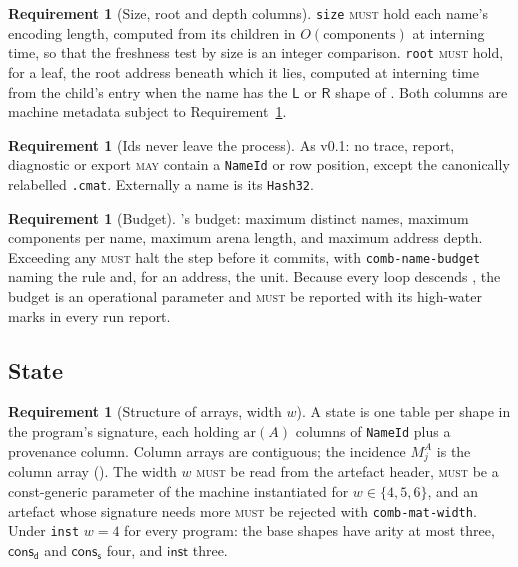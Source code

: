 \documentclass[11pt,a4paper]{article}
\newcommand{\code}[1]{\texttt{#1}}
\newcommand{\MUST}{\textsc{must}}
\newcommand{\MAY}{\textsc{may}}
\newcommand{\dd}{\mathsf{d}}
\newcommand{\sy}{\mathsf{s}}
\newcommand{\cons}{\mathsf{cons}}
\theoremstyle{definition}
\newtheorem{requirement}[definition]{Requirement}
\theoremstyle{plain}
\newcommand{\Lft}{\mathsf{L}}
\newcommand{\Rgt}{\mathsf{R}}
\newcommand{\inst}{\mathsf{inst}}
\begin{document}
\begin{requirement}[Size, root and depth columns]\label{req:roots}
\code{size} \MUST{} hold each name's encoding length, computed from its
children in $O(\text{components})$ at interning time, so that the freshness
test by size \cite[Lem.~6.14]{draft3} is an integer comparison. \code{root}
\MUST{} hold, for a leaf, the root address beneath which it lies, computed at
interning time from the child's entry when the name has the $\Lft$ or $\Rgt$
shape of \cite[Def.~6.6]{draft3}. Both columns are machine metadata subject
to Requirement~\ref{req:noidleak}.
\end{requirement}

\begin{requirement}[Ids never leave the process]\label{req:noidleak}
As v0.1: no trace, report, diagnostic or export \MAY{} contain a \code{NameId}
or row position, except the canonically relabelled \code{.cmat}. Externally a
name is its \code{Hash32}.
\end{requirement}

\begin{requirement}[Budget]\label{req:budget}
\cite[Req.~9.7]{combspec}'s budget: maximum distinct names, maximum
components per name, maximum arena length, and maximum address depth.
Exceeding any \MUST{} halt the step before it commits, with
\code{comb-name-budget} naming the rule and, for an address, the unit.
Because every loop descends \cite[Haz.~9.6]{combspec}, the budget is an
operational parameter and \MUST{} be reported with its high-water marks in
every run report.
\end{requirement}

\subsection{State}

\begin{requirement}[Structure of arrays, width $w$]\label{req:soa}
A state is one table per shape in the program's signature, each holding
$\mathrm{ar}(A)$ columns of \code{NameId} plus a provenance column. Column
arrays are contiguous; the incidence $M^{A}_{j}$ is the column array
(\cite[Def.~7.1]{matnote}). The width $w$ \MUST{} be read from the artefact
header, \MUST{} be a const-generic parameter of the machine instantiated for
$w \in \{4,5,6\}$, and an artefact whose signature needs more \MUST{} be
rejected with \code{comb-mat-width}. Under \code{inst} $w = 4$ for every
program: the base shapes have arity at most three, $\cons_{\dd}$ and
$\cons_{\sy}$ four, and $\inst$ three.
\end{requirement}
\end{document}
